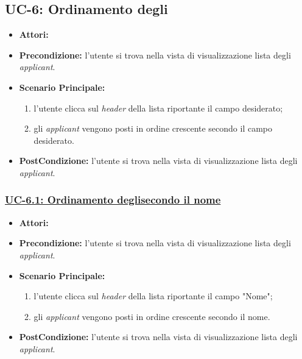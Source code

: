 \subsection{UC-6: Ordinamento degli\applicant}
\begin{itemize}
	\item \textbf{Attori:}\loggedusr
	\item \textbf{Precondizione:} l'utente si trova nella vista di visualizzazione lista degli \textit{applicant}.
	\item \textbf{Scenario Principale:}
	\begin{enumerate}
		\item l'utente clicca sul \textit{header} della lista riportante il campo desiderato;
		\item gli \textit{applicant} vengono posti in ordine crescente secondo il campo desiderato.
	\end{enumerate}
	\item \textbf{PostCondizione:}  l'utente si trova nella vista di visualizzazione lista degli \textit{applicant}.
\end{itemize}


\subsubsection{\underline{UC-6.1: Ordinamento degli\applicant secondo il nome}}
\begin{itemize}
	\item \textbf{Attori:}\loggedusr
	\item \textbf{Precondizione:} l'utente si trova nella vista di visualizzazione lista degli \textit{applicant}.
	\item \textbf{Scenario Principale:}
	\begin{enumerate}
		\item l'utente clicca sul \textit{header} della lista riportante il campo "Nome";
		\item gli \textit{applicant} vengono posti in ordine crescente secondo il nome.
	\end{enumerate}
	\item \textbf{PostCondizione:}  l'utente si trova nella vista di visualizzazione lista degli \textit{applicant}.
\end{itemize}


